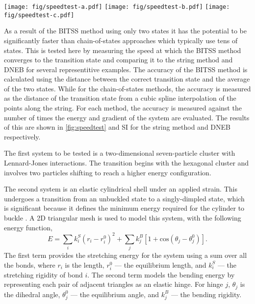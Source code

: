 \documentclass[aps,twocolumn]{revtex4-1}
\newcommand{\temp}[1]{{\leavevmode\color{red}#1}}
\begin{document}
\begin{figure*}[htb]
  \centering
  \texttt{[image: fig/speedtest-a.pdf]}%
  \texttt{[image: fig/speedtest-b.pdf]}%
  \texttt{[image: fig/speedtest-c.pdf]}%
  \caption{
    The rate of convergence to the transition state for (a) a Lennard-Jones seven-particle cluster, (b) cylindrical shell buckling, (c) wetting of a chemically-striped surface.
    Above are the two minimum energy states and the transition state between them.
    Below is shown the convergence to the transition state as a function of the number of gradient calculations using the BITSS (black line) and string methods.
    The string method is repeated with a differing number of images along the string, the number of which is listed in the legend in (c).
  }
  \label{fig:speedtest}
\end{figure*}

\topic As a result of the BITSS method using only two states it has the potential to be significantly faster than chain-of-states approaches which typically use tens of states.
This is tested here by measuring the speed at which the BITSS method converges to the transition state and comparing it to the string method and DNEB for several representitive examples.
The accuracy of the BITSS method is calculated using the distance between the correct transition state and the average of the two states.
While for the chain-of-states methods, the accuracy is measured as the distance of the transition state from a cubic spline interpolation of the points along the string.
For each method, the accuracy is measured against the number of times the energy and gradient of the system are evaluated.
The results of this are shown in \cref{fig:speedtest} and \temp{SI} for the string method and DNEB respectively.

\topic The first system to be tested is a two-dimensional seven-particle cluster with Lennard-Jones interactions.
The transition begins with the hexagonal cluster and involves two particles shifting to reach a higher energy configuration.

\topic The second system is an elastic cylindrical shell under an applied strain.
This undergoes a transition from an unbuckled state to a singly-dimpled state, which is significant because it defines the minimum energy required for the cylinder to buckle \cite{Panter2019}.
A 2D triangular mesh is used to model this system, with the following energy function,
\begin{equation}
  E = \sum_i k^S_i (r_i - r^0_i)^2 + \sum_j k^B_j [1 + \text{cos}(\theta_j - \theta^0_j)].
\end{equation}
The first term provides the stretching energy for the system using a sum over all the bonds, where $r_i$ is the length, $r^0_i$ --- the equilibrium length, and $k^S_i$ --- the stretching rigidity of bond $i$.
The second term models the bending energy by representing each pair of adjacent triangles as an elastic hinge.
For hinge $j$, $\theta_j$ is the dihedral angle, $\theta^0_j$ --- the equilibrium angle, and $k^B_j$ --- the bending rigidity.
\end{document}
